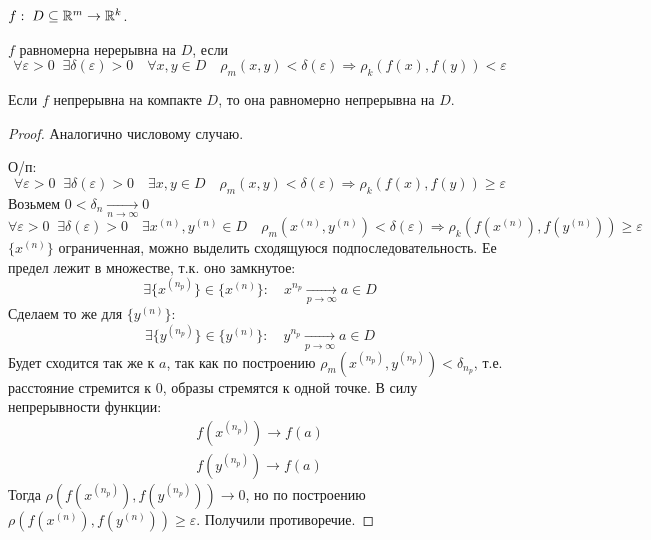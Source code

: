 \begin{definition}
    $f:\; D \subseteq \mathbb{R}^m \rightarrow \mathbb{R}^k$. 

    $f$ равномерна нерерывна на $D$, если
    \[
        \forall \varepsilon > 0\;\; \exists \delta(\varepsilon) > 0 \quad
        \forall x, y \in D \quad \rho_m(x, y) < \delta(\varepsilon) \Rightarrow \rho_k(f(x), f(y)) < \varepsilon
    \]
\end{definition}

\begin{theorem}
    Если $f$ непрерывна на компакте $D$, то она равномерно непрерывна на $D$.
\end{theorem}

\begin{proof}
    Аналогично числовому случаю.

    О/п:
    \[
        \forall \varepsilon > 0\;\; \exists \delta(\varepsilon) > 0 \quad
        \exists x, y \in D \quad \rho_m(x, y) < \delta(\varepsilon) \Rightarrow \rho_k(f(x), f(y)) \geqslant \varepsilon
    \]
     Возьмем $0 < \delta_n  \xrightarrow[n \rightarrow \infty]{} 0$
    \[
        \forall \varepsilon > 0\;\; \exists \delta(\varepsilon) > 0 \quad
        \exists x^{(n)}, y^{(n)} \in D \quad \rho_m(x^{(n)}, y^{(n)}) < \delta(\varepsilon) \Rightarrow \rho_k(f(x^{(n)}), f(y^{(n)})) \geqslant \varepsilon
    \]
    $\{x^{(n)}\}$ ограниченная, можно выделить сходящуюся подпоследовательность. Ее предел лежит в множестве, т.к. оно замкнутое:
    \[
        \exists \{x^{(n_p)}\} \in \{x^{(n)}\}: \quad x^{n_p} \xrightarrow[p \rightarrow \infty]{} a \in D
    \]
    Сделаем то же для $\{y^{(n)}\}$: 
    \[
        \exists \{y^{(n_p)}\} \in \{y^{(n)}\}: \quad y^{n_p} \xrightarrow[p \rightarrow \infty]{} a \in D
    \]
    Будет сходится так же к $a$, так как по построению
    $\rho_m(x^{(n_p)}, y^{(n_p)}) < \delta_{n_p}$, т.е. расстояние стремится к 0, образы стремятся к одной точке.
    В силу непрерывности функции:
    \begin{gather*}
        f(x^{(n_p)}) \rightarrow f(a)\\
        f(y^{(n_p)}) \rightarrow f(a)
    \end{gather*}    
    Тогда $\rho(f(x^{(n_p)}), f(y^{(n_p)})) \rightarrow 0$, но по построению $\rho(f(x^{(n)}), f(y^{(n)})) \geqslant \varepsilon$. Получили противоречие.
\end{proof}
